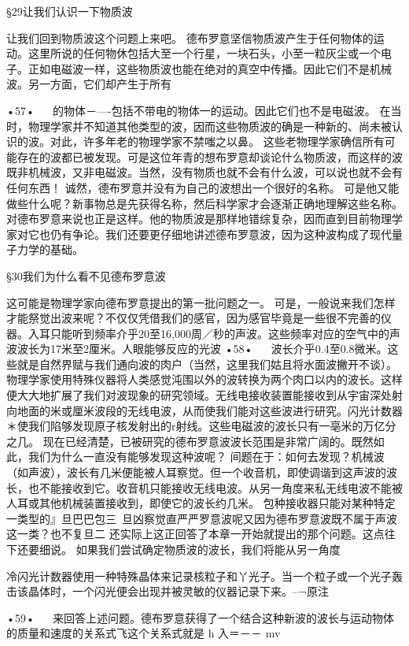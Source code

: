 §29让我们认识一下物质波

让我们回到物质波这个问题上来吧。
德布罗意坚信物质波产生于任何物体的运动。这里所说的任何物休包括大至一个行星，一块石头，小至一粒灰尘或一个电子。正如电磁波一样，这些物质波也能在绝对的真空中传播。因此它们不是机械波。另一方面，它们却产生于所有

•57•
  
的物体－—-包括不带电的物体一的运动。因此它们也不是电磁波。
在当时，物理学家并不知道其他类型的波，因而这些物质波的确是一种新的、尚未被认识的波。对此，许多年老的物理学家不禁嗤之以鼻。
这些老物理学家确信所有可能存在的波都已被发现。可是这位年青的想布罗意却谈论什么物质波，而这样的波既非机械波，又非电磁波。当然，没有物质也就不会有什么波，可以说也就不会有任何东西！
诚然，德布罗意并没有为自己的波想出一个很好的名称。
可是他又能做些什么呢？新事物总是先获得名称，然后科学家才会逐渐正确地理解这些名称。
对德布罗意来说也正是这样。他的物质波是那样地错综复杂，因而直到目前物理学家对它也仍有争论。我们还要更仔细地讲述德布罗意波，因为这种波构成了现代量子力学的基础。

§30我们为什么看不见德布罗意波

这可能是物理学家向德布罗意提出的第一批问题之一。
可是，一般说来我们怎样才能祭觉出波来呢？不仅仅凭借我们的感官，因为感官毕竟是一些很不完善的仪器。入耳只能听到频率介乎20至16,000周／秒的声波。这些频率对应的空气中的声波波长为17米至2厘米。人眼能够反应的光波
•58•
  
波长介乎0.4至0.8微米。这些就是自然界赋与我们通向波的肉户（当然，这里我们姑且将水面波撇开不谈）。
物理学家使用特殊仪器将人类感觉沌围以外的波转换为两个肉口以内的波长。这样便大大地扩展了我们对波现象的研究领域。无线电接收装置能接收到从宇宙深处射向地面的米或厘米波段的无线电波，从而使我们能对这些波进行研究。闪光计数器＊使我们陷够发现原子核发射出的r射线。这些电磁波的波长只有一亳米的万亿分之几。
现在已经清楚，已被研究的德布罗意波波长范围是非常广阔的。既然如此，我们为什么一直没有能够发现这种波呢？
间题在于：如何去发现？机械波（如声波），波长有几米便能被人耳察觉。但一个收音机，即使调谐到这声波的波长，也不能接收到它。收音机只能接收无线电波。从另一角度来私无线电波不能被人耳或其他机械装置接收到，即使它的波长约几米。
包种接收器只能对某种特定一类型的』旦巴巴包三~旦凶察觉直严严罗意波呢又因为德布罗意波既不属于声波这一类？也不复旦二
还实际上这正回答了本章一开始就提出的那个问题。这点往下还要细说。
如果我们尝试确定物质波的波长，我们将能从另一角度

冷闪光计数器使用一种特殊晶体来记录核粒子和丫光子。当一个粒子或一个光子轰击该晶体时，一个闪光便会出现并被灵敏的仪器记录下来。--¬原注

•59•
  
来回答上述问题。德布罗意获得了一个结合这种新波的波长与运动物体的质量和速度的关系式飞这个关系式就是
h
入＝－－
mv

